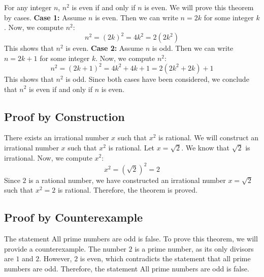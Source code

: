 For any integer \( n \), \( n^2 \) is even if and only if \( n \) is even.
\newline
	We will prove this theorem by cases.
\newline
	\textbf{Case 1:} Assume \( n \) is even. Then we can write \( n = 2k \) for some integer \( k \).
\newline
	Now, we compute \( n^2 \):
	\[
		n^2 = {(2k)}^2 = 4k^2 = 2(2k^2)
	\]
	This shows that \( n^2 \) is even.
\newline
	\textbf{Case 2:} Assume \( n \) is odd. Then we can write \( n = 2k + 1 \) for some integer \( k \).
\newline
	Now, we compute \( n^2 \):
	\[
		n^2 = {(2k + 1)}^2 = 4k^2 + 4k + 1 = 2(2k^2 + 2k) + 1
	\]
	This shows that \( n^2 \) is odd.
\newline
	Since both cases have been considered, we conclude that \( n^2 \) is even if and only if \( n \) is even.
\QED

\subsection{Proof by Construction}

There exists an irrational number \( x \) such that \( x^2 \) is rational.
\newline
	We will construct an irrational number \( x \) such that \( x^2 \) is rational.
\newline
	Let \( x = \sqrt{2} \). We know that \( \sqrt{2} \) is irrational. Now, we compute \( x^2 \):
	\[
		x^2 = (\sqrt{2})^2 = 2
	\]
	Since \( 2 \) is a rational number, we have constructed an irrational number \( x = \sqrt{2} \) such that \( x^2 = 2 \) is rational.
	Therefore, the theorem is proved.

\QED

\subsection{Proof by Counterexample}

The statement All prime numbers are odd is false.
\newline
	To prove this theorem, we will provide a counterexample.
\newline
	The number \( 2 \) is a prime number, as its only divisors are \( 1 \) and \( 2 \). However, \( 2 \) is even, which contradicts the statement that all prime numbers are odd.
\newline
	Therefore, the statement All prime numbers are odd is false.
\QED

